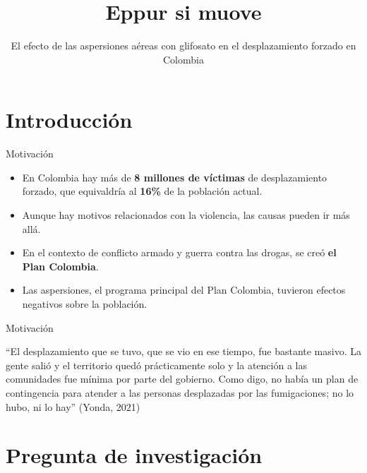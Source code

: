 \documentclass[
  ignorenonframetext,
]{beamer}
\title{Eppur si muove}
\subtitle{El efecto de las aspersiones aéreas con glifosato en el
desplazamiento forzado en Colombia}
\author{}
\date{}
\begin{document}
\frame{\titlepage}
\ifdefined\Shaded\renewenvironment{Shaded}{\begin{tcolorbox}[boxrule=0pt, enhanced, breakable, interior hidden, borderline west={3pt}{0pt}{shadecolor}, sharp corners, frame hidden]}{\end{tcolorbox}}\fi

\hypertarget{introducciuxf3n}{%
\section{Introducción}\label{introducciuxf3n}}

\begin{frame}{Motivación}
\protect\hypertarget{motivaciuxf3n}{}
\hfill\break
\hfill\break
\hfill\break

\begin{itemize}
\item
  En Colombia hay más de \textbf{8 millones de víctimas} de
  desplazamiento forzado, que equivaldría al \textbf{16\%} de la
  población actual.\\
\item
  Aunque hay motivos relacionados con la violencia, las causas pueden ir
  más allá.\\
\item
  En el contexto de conflicto armado y guerra contra las drogas, se creó
  \textbf{el Plan Colombia}.\\
\item
  Las aspersiones, el programa principal del Plan Colombia, tuvieron
  efectos negativos sobre la población.
\end{itemize}
\end{frame}

\begin{frame}{Motivación}
\protect\hypertarget{motivaciuxf3n-1}{}
\hfill\break
\hfill\break

``El desplazamiento que se tuvo, que se vio en ese tiempo, fue bastante
masivo. La gente salió y el territorio quedó prácticamente solo y la
atención a las comunidades fue mínima por parte del gobierno. Como digo,
no había un plan de contingencia para atender a las personas desplazadas
por las fumigaciones; no lo hubo, ni lo hay'' (Yonda, 2021)
\end{frame}

\hypertarget{pregunta-de-investigaciuxf3n}{%
\section{Pregunta de investigación}\label{pregunta-de-investigaciuxf3n}}
\end{document}
